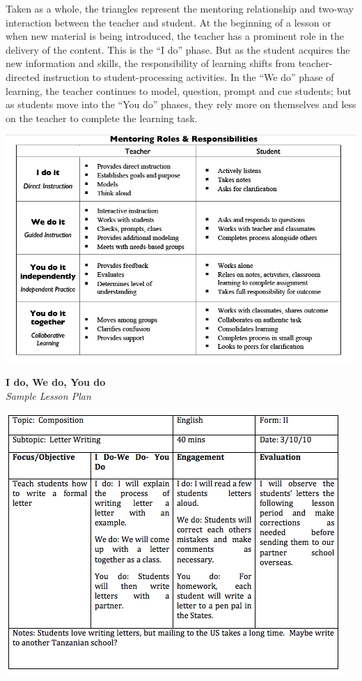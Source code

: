 Taken as a whole, the triangles represent the mentoring relationship and two-way interaction between the teacher and student. At the beginning of a lesson or when new material is being introduced, the teacher has a prominent role in the delivery of the content. This is the ``I do'' phase. But as the student acquires the new information and skills, the responsibility of learning shifts from teacher-directed instruction to student-processing activities. In the ``We do'' phase of learning, the teacher continues to model, question, prompt and cue students; but as students move into the ``You do'' phases, they rely more on themselves and less on the teacher to complete the learning task.

\begin{center}
\includegraphics[scale=0.7]{./img/i-do-you-do.png} 
\end{center}

\newpage
\begin{center}
\textbf{I do, We do, You do }\\
\textit{Sample Lesson Plan}
\end{center}

\begin{center}
\includegraphics[scale=1]{./img/picture-6.png} 
\end{center}

